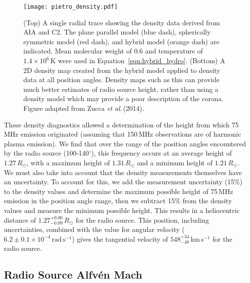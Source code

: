 \begin{figure}[ht!]
	\begin{center}
		\texttt{[image: pietro\_density.pdf]}
		\caption[2D density map of the corona]{(Top) A single radial trace showing the density data derived from AIA and C2. The plane parallel model (blue dash), spherically symmetric model (red dash), and hybrid model (orange dash) are indicated. Mean molecular weight of 0.6 and temperature of $1.4\times10^{6}$\,K were used in Equation~\ref{eqn:hybrid_hydro}. (Bottom) A 2D density map created from the hybrid model applied to density data at all position angles.
Density maps such as this can provide much better estimates of radio source height, rather than using a density model which may provide a poor description of the corona. Figure adapted from Zucca \emph{et al.}\,(2014).}
		\label{fig:density_map}
	\end{center}
\end{figure}

These density diagnostics allowed a determination of the height from which 75\,MHz emission originated (assuming that 150\,MHz observations are of harmonic plasma emission). We find that over the range of the position angles encountered by the radio source (100-140$^{\circ}$), this frequency occurs at an average height of $1.27\,R_{\odot}$, with a maximum height of $1.31\,R_{\odot}$ and a minimum height of $1.21\,R_{\odot}$. We must also take into account that the density measurements themselves have an uncertainty. To account for this, we add the measurement uncertainty (15\%) to the density values and determine the maximum possible height of 75\,MHz emission in the position angle range, then we subtract 15\% from the density values and measure the minimum possible height. This results in a heliocentric distance of $1.27^{+0.06}_{-0.09}\,R_{\odot}$ for the radio source. This position, including uncertainties, combined with the value for angular velocity ($6.2\pm0.1\times10^{-4}\,\mathrm{rad\,s^{-1}} $) gives the tangential velocity of $548^{+34}_{-48}$\,km\,s$^{-1}$ for the radio source.


\subsection{Radio Source Alfv\'{e}n Mach}


